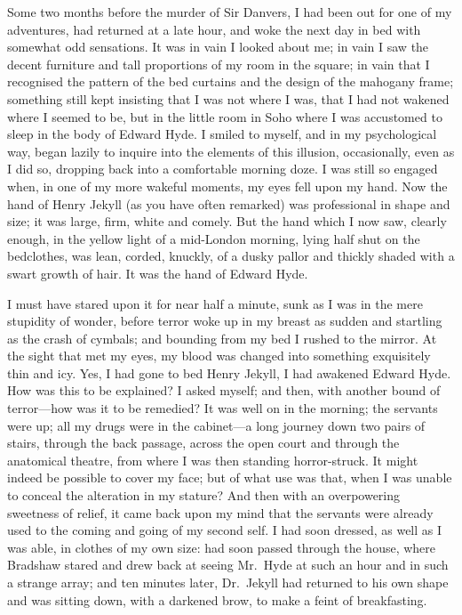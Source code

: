 \documentclass[12pt,openright]{book}
\begin{document}
Some two months before the murder of Sir Danvers, I had been out for one of my adventures, had returned at a late hour, and woke the next day in bed with somewhat odd sensations. It was in vain I looked about me; in vain I saw the decent furniture and tall proportions of my room in the square; in vain that I recognised the pattern of the bed curtains and the design of the mahogany frame; something still kept insisting that I was not where I was, that I had not wakened where I seemed to be, but in the little room in Soho where I was accustomed to sleep in the body of Edward Hyde. I smiled to myself, and in my psychological way, began lazily to inquire into the elements of this illusion, occasionally, even as I did so, dropping back into a comfortable morning doze. I was still so engaged when, in one of my more wakeful moments, my eyes fell upon my hand. Now the hand of Henry Jekyll (as you have often remarked) was professional in shape and size; it was large, firm, white and comely. But the hand which I now saw, clearly enough, in the yellow light of a mid-London morning, lying half shut on the bedclothes, was lean, corded, knuckly, of a dusky pallor and thickly shaded with a swart growth of hair. It was the hand of Edward Hyde.

I must have stared upon it for near half a minute, sunk as I was in the mere stupidity of wonder, before terror woke up in my breast as sudden and startling as the crash of cymbals; and bounding from my bed I rushed to the mirror. At the sight that met my eyes, my blood was changed into something exquisitely thin and icy. Yes, I had gone to bed Henry Jekyll, I had awakened Edward Hyde. How was this to be explained? I asked myself; and then, with another bound of terror—how was it to be remedied? It was well on in the morning; the servants were up; all my drugs were in the cabinet—a long journey down two pairs of stairs, through the back passage, across the open court and through the anatomical theatre, from where I was then standing horror-struck. It might indeed be possible to cover my face; but of what use was that, when I was unable to conceal the alteration in my stature? And then with an overpowering sweetness of relief, it came back upon my mind that the servants were already used to the coming and going of my second self. I had soon dressed, as well as I was able, in clothes of my own size: had soon passed through the house, where Bradshaw stared and drew back at seeing Mr. Hyde at such an hour and in such a strange array; and ten minutes later, Dr. Jekyll had returned to his own shape and was sitting down, with a darkened brow, to make a feint of breakfasting.
\end{document}
